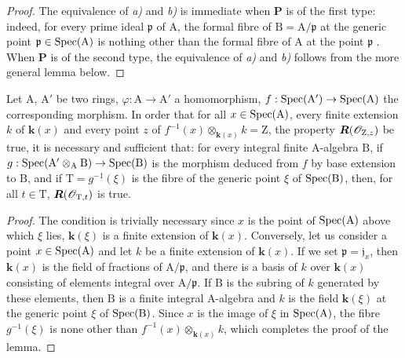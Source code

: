 \begin{proof}
The equivalence of \emph{a)} and \emph{b)} is immediate when $\boldsymbol{P}$ is of the first type: indeed, for every prime ideal $\mathfrak{p}$ of $\mathrm{A}$, the formal fibre of $\mathrm{B}=\mathrm{A}/\mathfrak{p}$ at the generic point $\mathfrak{p}\in\operatorname{Spec}(\mathrm{A})$ is nothing other than the formal fibre of $\mathrm{A}$ at the point $\mathfrak{p}$ .
When $\boldsymbol{P}$ is of the second type, the equivalence of \emph{a)} and \emph{b)} follows from the more general lemma below.
\end{proof}

\begin{lemma}[7.3.16.2]
\label{IV.7.3.16.2}
Let $\mathrm{A}$, $\mathrm{A}'$ be two rings, $\varphi:\mathrm{A}\to\mathrm{A}'$ a homomorphism, $f:\operatorname{Spec}(\mathrm{A}')\to\operatorname{Spec}(\mathrm{A})$ the corresponding morphism.
In order that for all $x\in\operatorname{Spec}(\mathrm{A})$, every
finite extension $k$ of $\boldsymbol{k}(x)$ and every point $z$ of $f^{-1}(x)\otimes_{\boldsymbol{k}(x)} k=\mathrm{Z}$, the property $\boldsymbol{R}(\mathscr{O}_{\mathrm{Z},z})$ be true, it is necessary and sufficient that: for every integral finite A-algebra $\mathrm{B}$, if $g:\operatorname{Spec}(\mathrm{A}'\otimes_\mathrm{A}\mathrm{B})\to\operatorname{Spec}(\mathrm{B})$ is the morphism deduced from $f$ by base extension to $\mathrm{B}$, and if $\mathrm{T}=g^{-1}(\xi)$ is the fibre of the generic point $\xi$ of $\operatorname{Spec}(\mathrm{B})$, then, for all $t\in\mathrm{T}$, $\boldsymbol{R}(\mathscr{O}_{\mathrm{T},t})$ is true.
\end{lemma}

\begin{proof}
The condition is trivially necessary since $x$ is the point of $\operatorname{Spec}(\mathrm{A})$ above which $\xi$ lies, $\boldsymbol{k}(\xi)$ is a finite extension of $\boldsymbol{k}(x)$.
Conversely, let us consider a point $x\in\operatorname{Spec}(\mathrm{A})$ and let $k$ be a finite extension of $\boldsymbol{k}(x)$.
If we set $\mathfrak{p}=\mathfrak{j}_x$, then $\boldsymbol{k}(x)$ is the field of fractions of $\mathrm{A}/\mathfrak{p}$, and there is a basis of $k$ over $\boldsymbol{k}(x)$ consisting of elements integral over $\mathrm{A}/\mathfrak{p}$.
If $\mathrm{B}$ is the subring of $k$ generated by these elements, then $\mathrm{B}$ is a finite integral $\mathrm{A}$-algebra and $k$ is the field $\boldsymbol{k}(\xi)$ at the generic point $\xi$ of $\operatorname{Spec}(\mathrm{B})$.
Since $x$ is the image of $\xi$ in $\operatorname{Spec}(\mathrm{A})$, the fibre $g^{-1}(\xi)$ is none other than $f^{-1}(x)\otimes_{\boldsymbol{k}(x)}k$, which completes the proof of the lemma.
\end{proof}

